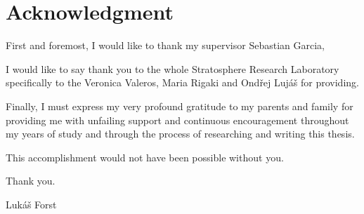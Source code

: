 \vspace*{\fill}

\section*{Acknowledgment}
First and foremost, I would like to thank my supervisor Sebastian Garcia,


I would like to say thank you to the whole Stratosphere Research Laboratory specifically to the Veronica Valeros, Maria Rigaki and Ondřej Lujáš for providing. 

\noindent
Finally, I must express my very profound gratitude to my parents and family for providing me with unfailing support and continuous encouragement throughout my years of study and through the process of researching and writing this thesis. 

\bigskip \noindent
This accomplishment would not have been possible without you.
  
\bigskip \noindent
Thank you.
  
\bigskip \noindent
\hspace*{\fill} Lukáš Forst

\thispagestyle{empty}

\cleardoublepage